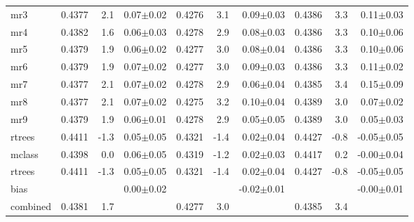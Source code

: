 \documentclass{article}
\begin{document}
\begin{table*}
\begin{center}
\begin{small}
\begin{sc}
\begin{tabular}{l|rr r|rr r|rr r}
mr3        & 0.4377 &   2.1 &  0.07$\pm$0.02& 0.4276 &   3.1 &  0.09$\pm$0.03& 0.4386 &   3.3 &  0.11$\pm$0.03 \\ 
mr4        & 0.4382 &   1.6 &  0.06$\pm$0.03& 0.4278 &   2.9 &  0.08$\pm$0.03& 0.4386 &   3.3 &  0.10$\pm$0.06 \\ 
mr5        & 0.4379 &   1.9 &  0.06$\pm$0.02& 0.4277 &   3.0 &  0.08$\pm$0.04& 0.4386 &   3.3 &  0.10$\pm$0.06 \\ 
mr6        & 0.4379 &   1.9 &  0.07$\pm$0.02& 0.4277 &   3.0 &  0.09$\pm$0.03& 0.4386 &   3.3 &  0.11$\pm$0.02 \\ 
mr7        & 0.4377 &   2.1 &  0.07$\pm$0.02& 0.4278 &   2.9 &  0.06$\pm$0.04& 0.4385 &   3.4 &  0.15$\pm$0.09 \\ 
mr8        & 0.4377 &   2.1 &  0.07$\pm$0.02& 0.4275 &   3.2 &  0.10$\pm$0.04& 0.4389 &   3.0 &  0.07$\pm$0.02 \\ 
mr9        & 0.4379 &   1.9 &  0.06$\pm$0.01& 0.4278 &   2.9 &  0.05$\pm$0.05& 0.4389 &   3.0 &  0.05$\pm$0.03 \\ 
rtrees     & 0.4411 &  -1.3 &  0.05$\pm$0.05& 0.4321 &  -1.4 &  0.02$\pm$0.04& 0.4427 &  -0.8 & -0.05$\pm$0.05 \\ 
\abovespace
mclass     & 0.4398 &   0.0 &  0.06$\pm$0.05& 0.4319 &  -1.2 &  0.02$\pm$0.03& 0.4417 &   0.2 & -0.00$\pm$0.04 \\ 
rtrees     & 0.4411 &  -1.3 &  0.05$\pm$0.05& 0.4321 &  -1.4 &  0.02$\pm$0.04& 0.4427 &  -0.8 & -0.05$\pm$0.05 \\ 
\abovespace
bias       &        &       &  0.00$\pm$0.02&        &       & -0.02$\pm$0.01&        &       & -0.00$\pm$0.01 \\ 
\abovespace\belowspace
combined   & 0.4381 &   1.7 &  & 0.4277 &   3.0 &  & 0.4385 &   3.4 &   \\ 
\hline
\end{tabular}
\end{sc}
\end{small}
\end{center}
\vskip -0.1in
\end{table*}
\end{document}
